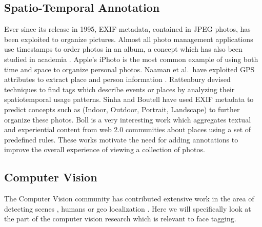 \subsection{Spatio-Temporal Annotation}
Ever since its release in 1995, EXIF metadata, contained in JPEG photos, has been exploited to organize pictures. Almost all photo management applications use timestamps to order photos in an album, a concept which has also been studied in academia \cite{graham2002time, hailpern2011youpivot}. Apple's iPhoto is the most common example of using both time and space to organize personal photos. Naaman et al.\ have exploited GPS attributes to extract place and person information \cite{naaman2005leveraging, naaman2005identity}. Rattenbury \cite{rattenbury2009methods} devised techniques to find tags which describe events or places by analyzing their spatiotemporal usage patterns. Sinha \cite{sinha2008concept} and Boutell \cite{boutell2005beyond} have used EXIF metadata to predict concepts such as (Indoor, Outdoor, Portrait, Landscape) to further organize these photos. Boll \cite{boll2007semantics} is a very interesting work which aggregates textual and experiential content from web 2.0 communities about places using a set of predefined rules. These works motivate the need for adding annotations to improve the overall experience of viewing a collection of photos.

\subsection{Computer Vision}

The Computer Vision community has contributed extensive work in the area of detecting scenes \cite{xiao2010sun}, humans \cite{dalal2005histograms} or geo localization \cite{hays2008im2gps}. Here we will specifically look at the part of the computer vision research which is relevant to face tagging.

